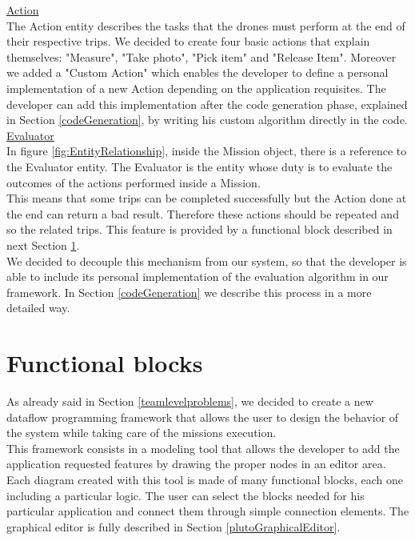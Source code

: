 \underline{Action}
\\

The Action entity describes the tasks that the drones must perform at the end of their respective trips.
We decided to create four basic actions that explain themselves: "Measure", "Take photo", "Pick item" and "Release Item". 
Moreover we added a "Custom Action" which enables the developer to define a personal implementation of a new Action depending on the application requisites.
The developer can add this implementation after the code generation phase, explained in Section \ref{codeGeneration}, by writing his custom algorithm directly in the code.
\\

\underline{Evaluator}
\\

In figure \ref{fig:EntityRelationship}, inside the Mission object, there is a reference to the Evaluator entity. 
The Evaluator is the entity whose duty is to evaluate the outcomes of the actions performed inside a Mission.
\\
This means that some trips can be completed successfully but the Action done at the end can return a bad result. Therefore these actions should be repeated and so the related trips. This feature is provided by a functional block described in next Section \ref{functionalBlocks}.
\\
We decided to decouple this mechanism from our system, so that the developer is able to include its personal implementation of the evaluation algorithm in our framework. 
In Section \ref{codeGeneration} we describe this process in a more detailed way.
\\

\section{Functional blocks}
\label{functionalBlocks}

As already said in Section \ref{teamlevelproblems}, we decided to create a new dataflow programming framework that allows the user to design the behavior of the system while taking care of the missions execution.
\\

This framework consists in a modeling tool that allows the developer to add the application requested features by drawing the proper nodes in an editor area.
\\
Each diagram created with this tool is made of many functional blocks, each one including a particular logic.
The user can select the blocks needed for his particular application and connect them through simple connection elements.
The graphical editor is fully described in Section \ref{plutoGraphicalEditor}.
\\

